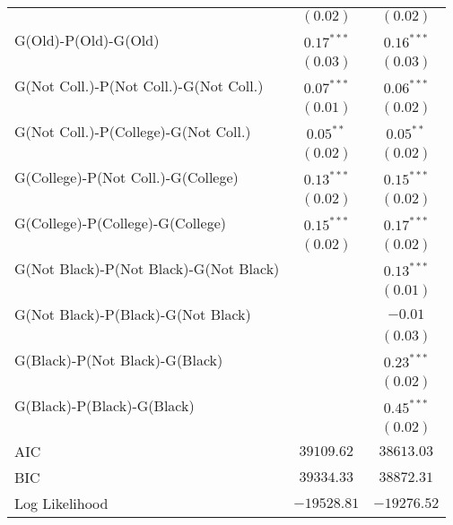 \begin{center}
\begin{longtable}{l c c}
                                       & $(0.02)$      & $(0.02)$      \\
G(Old)-P(Old)-G(Old)                   & $0.17^{***}$  & $0.16^{***}$  \\
                                       & $(0.03)$      & $(0.03)$      \\
G(Not Coll.)-P(Not Coll.)-G(Not Coll.) & $0.07^{***}$  & $0.06^{***}$  \\
                                       & $(0.01)$      & $(0.02)$      \\
G(Not Coll.)-P(College)-G(Not Coll.)   & $0.05^{**}$   & $0.05^{**}$   \\
                                       & $(0.02)$      & $(0.02)$      \\
G(College)-P(Not Coll.)-G(College)     & $0.13^{***}$  & $0.15^{***}$  \\
                                       & $(0.02)$      & $(0.02)$      \\
G(College)-P(College)-G(College)       & $0.15^{***}$  & $0.17^{***}$  \\
                                       & $(0.02)$      & $(0.02)$      \\
G(Not Black)-P(Not Black)-G(Not Black) &               & $0.13^{***}$  \\
                                       &               & $(0.01)$      \\
G(Not Black)-P(Black)-G(Not Black)     &               & $-0.01$       \\
                                       &               & $(0.03)$      \\
G(Black)-P(Not Black)-G(Black)         &               & $0.23^{***}$  \\
                                       &               & $(0.02)$      \\
G(Black)-P(Black)-G(Black)             &               & $0.45^{***}$  \\
                                       &               & $(0.02)$      \\
\midrule
AIC                                    & $39109.62$    & $38613.03$    \\
BIC                                    & $39334.33$    & $38872.31$    \\
Log Likelihood                         & $-19528.81$   & $-19276.52$   \\
\end{longtable}
\end{center}
